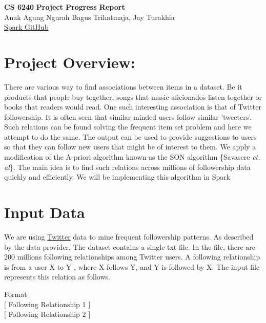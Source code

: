 \documentclass[11pt]{article}
\begin{document}
\thispagestyle{empty}
\setlength{\parindent}{0pt}
\setlength{\parskip}{1.8ex}
\lstset{language=Scala}
\newcommand{\hs}{\hspace{.1in}}

\begin{center}
    \Large{\bf CS 6240}
    \Large{\bf Project Progress Report\\}
    \Large{Anak Agung Ngurah Bagus Trihatmaja, Jay Turakhia\\}
    \href{https://github.ccs.neu.edu/prdx/CS6240-Project}{Spark GitHub}  \\
\end{center}
\medskip

\section{Project Overview: }
There are various way to find associations between items in a dataset.
Be it products that people buy together, songs that music aficionados listen together or books that readers would read.
One such interesting association is that of Twitter followership.
It is often seen that similar minded users follow similar 'tweeters'.\\
Such relations can be found solving the frequent item set problem and here we attempt to do the same.
The output can be used to provide suggestions to users so that they can follow new users that might be of interest to them.
We apply a modification of the A-priori algorithm known as the SON algorithm \{Savasere \textit  {et. al}\}.
The main idea is to find such relations across millions of followership data quickly and efficiently.
We will be implementing this algorithm in Spark\\

\section{Input Data}
We are using \href{https://wiki.illinois.edu//wiki/display/forward/Dataset-UDI-TwitterCrawl-Aug2012}{Twitter} data to mine frequent followership patterns.
As described by the data provider.
The dataset contains a single txt file.
In the file, there are 200 millions following relationships among Twitter users.
A following relationship is from a user X to Y , where X follows Y, and Y is followed by X.
The input file represents this relation as follows.

Format\\
$\big[$ Following Relationship 1 $\big]$\\
$\big[$ Following Relationship 2 $\big]$\\
\end{document}
